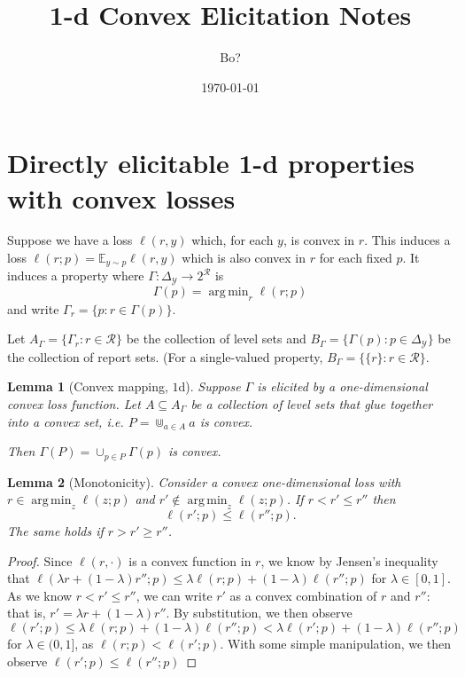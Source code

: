 \documentclass[12pt]{article}
\title{1-d Convex Elicitation Notes}
\author{Bo?}
\date{\today}
\newcommand{\E}{\mathbb{E}}
\newcommand{\R}{\mathcal{R}}
\newcommand{\Y}{\mathcal{Y}}
\DeclareMathOperator*{\argmin}{arg\,min}
\newtheorem{lemma}{Lemma}
\theoremstyle{definition}
\begin{document}
\maketitle

\section{Directly elicitable 1-d properties with convex losses}

Suppose we have a loss $\ell(r,y)$ which, for each $y$, is convex in $r$.
This induces a loss $\ell(r;p) = \E_{y\sim p} \ell(r,y)$ which is also convex in $r$ for each fixed $p$.
It induces a property where $\Gamma: \Delta_{\Y} \to 2^{\R}$ is
  \[ \Gamma(p) = \argmin_r \ell(r;p) \]
and write $\Gamma_r = \{p : r \in \Gamma(p) \}$.

Let $A_{\Gamma} = \{\Gamma_r : r \in \R\}$ be the collection of level sets and $B_{\Gamma} = \{\Gamma(p) : p \in \Delta_{\Y}\}$ be the collection of report sets. (For a single-valued property, $B_{\Gamma} = \{\{r\} : r \in \R\}$.

%
\begin{lemma}[Convex mapping, $1$d] \label{lemma:convex-map}
  Suppose $\Gamma$ is elicited by a one-dimensional convex loss function.
  Let $A \subseteq A_{\Gamma}$ be a collection of level sets that glue together into a convex set, i.e. $P = \Cup_{a \in A} a$ is convex.

  Then $\Gamma(P) = \cup_{p \in P} \Gamma(p)$ is convex.
\end{lemma}

\begin{lemma}[Monotonicity] \label{lemma:monot}
  Consider a convex one-dimensional loss with $r \in \argmin_{z} \ell(z;p)$ and $r' \not\in \argmin_z \ell(z;p)$.
  If $r < r' \leq r''$ then
    \[ \ell(r';p) \leq \ell(r'';p) . \]
  The same holds if $r > r' \geq r''$.
\end{lemma}
\begin{proof}
  Since $\ell(r,\cdot)$ is a convex function in $r$, we know by Jensen's inequality that $\ell(\lambda r + (1-\lambda)r''; p) \leq \lambda \ell(r; p) + (1-\lambda) \ell(r''; p)$ for $\lambda \in [0,1]$.
  As we know $r < r' \leq r''$, we can write $r'$ as a convex combination of $r$ and $r''$: that is, $r' = \lambda r + (1-\lambda) r''$.
  By substitution, we then observe $\ell(r'; p) \leq \lambda \ell(r; p) + (1-\lambda) \ell(r''; p) < \lambda \ell(r'; p) + (1-\lambda) \ell(r''; p)$ for $\lambda \in (0,1]$, as $\ell(r;p) < \ell(r';p)$.
  With some simple manipulation, we then observe $\ell(r';p) \leq \ell(r'';p)$
  
\end{proof}
\end{document}
